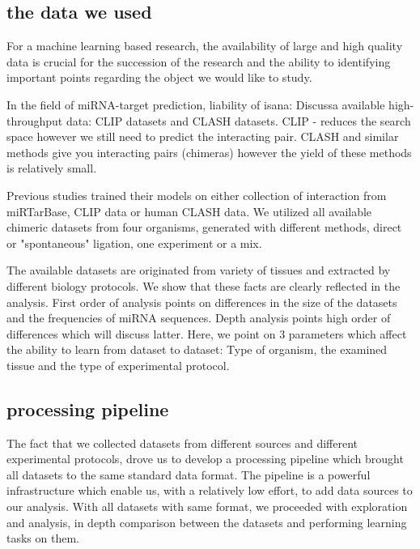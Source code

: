 \documentclass{bmcart}
\begin{document}
\subsection*{the data we used}
For a machine learning based research, the availability of large and high quality data is crucial for the succession of the research and the ability to identifying important points regarding the object we would like to study.

In the field of miRNA-target prediction, liability of isana: Discussa available high-throughput data: CLIP datasets and CLASH datasets. CLIP - reduces the search space however we still need to predict the interacting pair. CLASH and similar methods give you interacting pairs (chimeras) however the yield of these methods is relatively small. 

Previous studies trained their models on either collection of interaction from miRTarBase, CLIP data or human CLASH data. We utilized all available chimeric datasets from four organisms, generated with different methods, direct or "spontaneous" ligation, one experiment or a mix.

The available datasets are originated from variety of tissues and extracted by different biology protocols. We show that these facts are clearly reflected in the analysis. First order of analysis points on differences in the size of the datasets and the frequencies of miRNA sequences. Depth analysis points high order of differences which will discuss latter. Here, we point on 3 parameters which affect the ability to learn from dataset to dataset: Type of organism, the examined tissue and the type of experimental protocol.

\subsection*{processing pipeline}
The fact that we collected datasets from different sources and different experimental protocols, drove us to develop a processing pipeline which brought all datasets to the same standard data format. The pipeline is a powerful infrastructure which enable us, with a relatively low effort, to add data sources to our analysis. With all datasets with same format, we proceeded with exploration and analysis, in depth comparison between the datasets and performing learning tasks on them.
\end{document}

